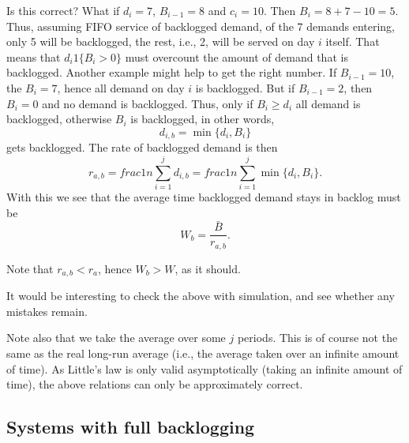 \begin{question}
\begin{solution}
    Is this correct? What if $d_i=7$, $B_{i-1}=8$ and $c_i= 10$. Then
    $B_{i} = 8+7-10 = 5$. Thus, assuming FIFO service of backlogged
    demand, of the 7 demands entering, only 5 will be backlogged, the
    rest, i.e., 2, will be served on day $i$ itself. That means that
    $d_i 1\{B_i>0\}$ must overcount the amount of demand that is
    backlogged. Another example might help to get the right number. If
    $B_{i-1}=10$, the $B_i=7$, hence all demand on day $i$ is
    backlogged. But if $B_{i-1}=2$, then $B_i = 0$ and no demand is
    backlogged. Thus, only if $B_i\geq d_i$ all demand is backlogged,
    otherwise $B_i$ is backlogged, in other words, 
    \begin{equation*}
      d_{i,b} = \min\{d_i, B_i\}
    \end{equation*}
    gets backlogged. The rate of  backlogged demand is then
    \begin{equation*}
      r_{a,b} =
      frac 1 n \sum_{i=1}^j d_{i,b} = frac 1 n \sum_{i=1}^j \min\{d_i, B_i\}.
    \end{equation*}
    With this we see that the average time backlogged demand stays in
    backlog must be
    \begin{equation*}
      W_b  = \frac{\bar B}{r_{a,b}}. 
    \end{equation*}

    Note that $r_{a,b} < r_a$, hence $W_b > W$, as it should.

    It would be interesting to check the above with simulation, and
    see whether any mistakes remain. 

    Note also that we take the average over some $j$ periods. This is
    of course not the same as the real long-run average (i.e., the
    average taken over an infinite amount of time). As Little's law is
    only valid asymptotically (taking an infinite amount of time), the
    above relations can only be approximately correct.
    
  \end{solution}
\end{question}

\subsection{Systems with full backlogging}
\label{sec:systems-with-backlog}

